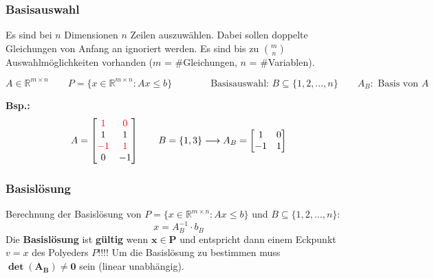   \subsubsection{Basisauswahl}
    Es sind bei $n$ Dimensionen $n$ Zeilen auszuwählen. Dabei sollen doppelte Gleichungen von Anfang an ignoriert werden.
    Es sind bis zu $\binom{m}{n}$ Auswahlmöglichkeiten vorhanden ($m$ = \#Gleichungen, $n$ = \#Variablen).
    
    \[ A \in \mathbb{R}^{m\times n} \qquad P = \{ x \in \mathbb{R}^{m\times n} : A x \leq b \} \qquad \qquad \text{Basisauswahl: }B\subseteq \{1,2,...,n\} \qquad  A_B : \text{ Basis von }A \]
    
    \textbf{Bsp.:}
    \[  A=
    	\begin{bmatrix}
    		\textcolor{red}{1} & \textcolor{red}{0} \\
    		1 & 1 \\
    		\textcolor{red}{-1} & \textcolor{red}{1} \\
    		0 & -1
    	\end{bmatrix}
    	\qquad
    	B=\{1,3\} \longrightarrow A_B = 
    	\begin{bmatrix}
 	    		1 & 0 \\
 	    		-1 & 1
    	 \end{bmatrix}
    \]
    
    
  \subsubsection{Basislösung}
  	Berechnung der Basislösung von $P = \{ x \in \mathbb{R}^{m\times n} : A x \leq b \}$ und $B\subseteq \{1,2,...,n\}$:
  	\[ x = A_B^{-1} \cdot b_B \]
  	Die \textbf{Basislösung} ist \textbf{gültig} wenn $\mathbf{x \in P}$ und entspricht dann einem Eckpunkt $v=x$ des Polyeders $P$!!!!
    Um die Basislösung zu bestimmen muss $\mathbf{\det(A_B)\neq 0}$ sein (linear unabhängig).
    
    
